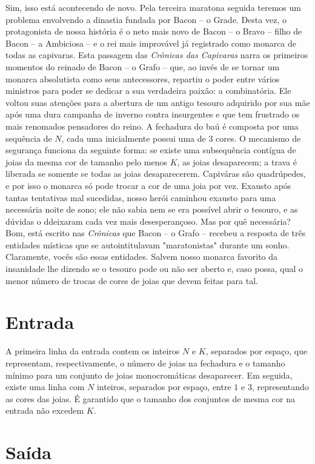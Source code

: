 Sim, isso está acontecendo de novo.
Pela terceira maratona seguida teremos um problema envolvendo a dinastia fundada por Bacon -- o Grade.
Desta vez, o protagonista de nossa história é o neto mais novo de Bacon -- o Bravo -- filho de Bacon -- a Ambiciosa -- e o rei mais improvável já registrado como monarca de todas as capivaras.
Esta passagem das \textit{Crônicas das Capivaras} narra os primeiros momentos do reinado de Bacon -- o Grafo -- que, ao invés de se tornar um monarca absolutista como seus antecessores, repartiu o poder entre vários ministros para poder se dedicar a sua verdadeira paixâo: a combinatória.
Ele voltou suas atenções para a abertura de um antigo tesouro adquirido por sua mãe após uma dura campanha de inverno contra insurgentes e que tem frustrado os mais renomados pensadores do reino.
A fechadura do baú é composta por uma sequência de $N$, cada uma inicialmente possui uma de $3$ cores.
O mecanismo de segurança funciona da seguinte forma: se existe uma subsequência contígua de joias da mesma cor de tamanho pelo menos $K$, as joias desaparecem; a trava é liberada se somente se todas as joias desaparecerem.
Capiváras são quadrúpedes, e por isso o monarca só pode trocar a cor de uma joia por vez.
Exausto após tantas tentativas mal sucedidas, nosso herói caminhou exausto para uma necessária noite de sono; ele não sabia nem se era possível abrir o tesouro, e as dúvidas o ddeixaram cada vez mais desesperançoso.
Mas por quê necessária?
Bom, está escrito nas \textit{Crônicas} que Bacon -- o Grafo -- recebeu a resposta de três entidades místicas que se autointitulavam "maratonistas" durante um sonho.
Claramente, vocês são essas entidades.
Salvem nosso monarca favorito da insanidade lhe dizendo se o tesouro pode ou não ser aberto e, caso possa, qual o menor número de trocas de cores de joias que devem feitas para tal.


\section*{Entrada}

A primeira linha da entrada contem os inteiros $N$ e $K$, separados por espaço, que representam, respectivamente, o número de joias na fechadura  e o tamanho mínimo para um conjunto de joias monocromáticas desaparecer.
Em seguida, existe uma linha com $N$ inteiros, separados por espaço, entre $1$ e $3$, representando as cores das joias.
É garantido que o tamanho dos conjuntos de mesma cor na entrada não excedem $K$.

\section*{Saída}

